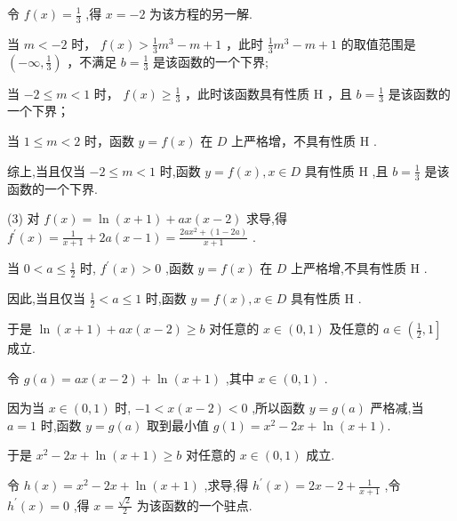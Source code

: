 \documentclass[10pt]{article}
\newcommand*\circled[1]{\tikz[baseline=(char.base)]{\node[shape=circle,draw,inner sep=1.5pt] (char) {\small #1};}}
\begin{document}
令 \(f\left( x\right)  = \frac{1}{3}\) ,得 \(x =  - 2\) 为该方程的另一解.

 \circled{1}  当 \(m <  - 2\) 时， \(f\left( x\right)  > \frac{1}{3}{m}^{3} - m + 1\) ，此时 \(\frac{1}{3}{m}^{3} - m + 1\) 的取值范围是 \(\left( {-\infty ,\frac{1}{3}}\right)\) ，不满足 \(b = \frac{1}{3}\) 是该函数的一个下界;

 \circled{2} 当 \(- 2 \leq  m < 1\) 时， \(f\left( x\right)  \geq  \frac{1}{3}\) ，此时该函数具有性质 \(\mathrm{H}\) ，且 \(b = \frac{1}{3}\) 是该函数的一个下界；

 \circled{3}  当 \(1 \leq  m < 2\) 时，函数 \(y = f\left( x\right)\) 在 \(D\) 上严格增，不具有性质 \(\mathrm{H}\) .

综上,当且仅当 \(- 2 \leq  m < 1\) 时,函数 \(y = f\left( x\right) ,x \in  D\) 具有性质 \(\mathrm{H}\) ,且 \(b = \frac{1}{3}\) 是该函数的一个下界.

(3) 对 \(f\left( x\right)  = \ln \left( {x + 1}\right)  + {ax}\left( {x - 2}\right)\) 求导,得 \({f}^{\prime }\left( x\right)  = \frac{1}{x + 1} + {2a}\left( {x - 1}\right)  = \frac{{2a}{x}^{2} + \left( {1 - {2a}}\right) }{x + 1}\) .

当 \(0 < a \leq  \frac{1}{2}\) 时, \({f}^{\prime }\left( x\right)  > 0\) ,函数 \(y = f\left( x\right)\) 在 \(D\) 上严格增,不具有性质 \(\mathrm{H}\) .

因此,当且仅当 \(\frac{1}{2} < a \leq  1\) 时,函数 \(y = f\left( x\right) ,x \in  D\) 具有性质 \(\mathrm{H}\) .

于是 \(\ln \left( {x + 1}\right)  + {ax}\left( {x - 2}\right)  \geq  b\) 对任意的 \(x \in  \left( {0,1}\right)\) 及任意的 \(a \in  \left( {\frac{1}{2},1}\right\rbrack\) 成立.

令 \(g\left( a\right)  = {ax}\left( {x - 2}\right)  + \ln \left( {x + 1}\right)\) ,其中 \(x \in  \left( {0,1}\right)\) .

因为当 \(x \in  \left( {0,1}\right)\) 时, \(- 1 < x\left( {x - 2}\right)  < 0\) ,所以函数 \(y = g\left( a\right)\) 严格减,当 \(a = 1\) 时,函数 \(y = g\left( a\right)\) 取到最小值 \(g\left( 1\right)  = {x}^{2} - {2x} + \ln \left( {x + 1}\right) .\)

于是 \({x}^{2} - {2x} + \ln \left( {x + 1}\right)  \geq  b\) 对任意的 \(x \in  \left( {0,1}\right)\) 成立.

令 \(h\left( x\right)  = {x}^{2} - {2x} + \ln \left( {x + 1}\right)\) ,求导,得 \({h}^{\prime }\left( x\right)  = {2x} - 2 + \frac{1}{x + 1}\) ,令 \({h}^{\prime }\left( x\right)  = 0\) ,得 \(x = \frac{\sqrt{2}}{2}\) 为该函数的一个驻点.
\end{document}
